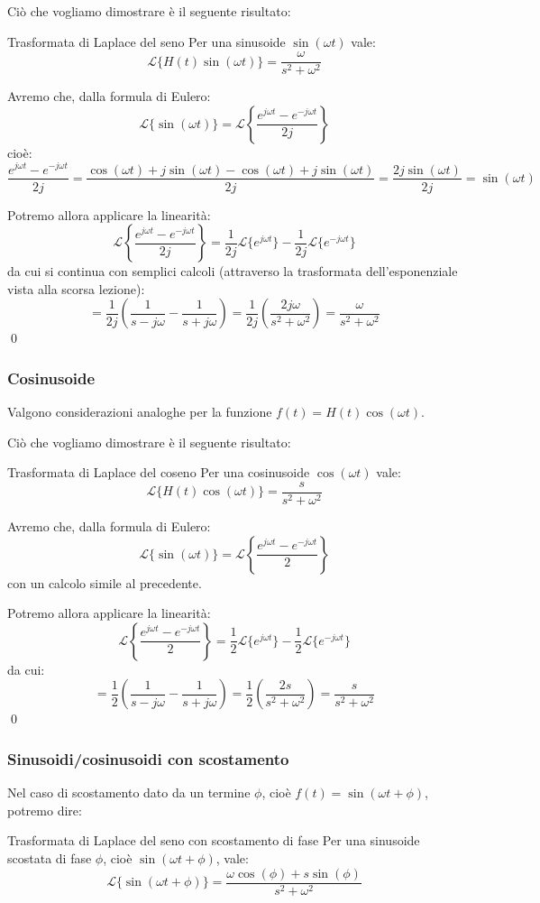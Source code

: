 \documentclass[a4paper,11pt]{article}
\begin{document}
Ciò che vogliamo dimostrare è il seguente risultato:
\begin{theorem}{Trasformata di Laplace del seno}
	Per una sinusoide $\sin(\omega t)$ vale:
	$$
		\mathcal{L}\{ H(t) \sin(\omega t) \} = \frac{\omega}{s^2 + \omega^2}
	$$
\end{theorem}

Avremo che, dalla formula di Eulero:
$$
\mathcal{L}\{\sin(\omega t)\} = \mathcal{L}\left\{ \frac{e^{j \omega t} - e^{- j \omega t}}{2j} \right\}
$$
cioè:
$$
\frac{e^{j \omega t} - e^{-j \omega t}}{2j} = \frac{ \cos(\omega t) + j \sin(\omega t) - \cos(\omega t) + j \sin(\omega t) }{2j} = \frac{2j \sin(\omega t)}{2j} = \sin(\omega t)
$$

Potremo allora applicare la linearità:
$$
\mathcal{L}\left\{ \frac{e^{j \omega t} - e^{- j \omega t}}{2j} \right\} = \frac{1}{2j} \mathcal{L}\{e^{j \omega t}\} - \frac{1}{2j} \mathcal{L}\{e^{-j \omega t}\}
$$
da cui si continua con semplici calcoli (attraverso la trasformata dell'esponenziale vista alla scorsa lezione):
$$
= \frac{1}{2j}\left( \frac{1}{s - j\omega} - \frac{1}{s + j \omega} \right) = \frac{1}{2j}\left( \frac{2j\omega}{s^2 + \omega^2} \right) = \frac{\omega}{s^2 + \omega^2}
$$ \qed

\subsubsection{Cosinusoide}
Valgono considerazioni analoghe per la funzione $f(t) = H(t) \cos(\omega t)$.

Ciò che vogliamo dimostrare è il seguente risultato:
\begin{theorem}{Trasformata di Laplace del coseno}
	Per una cosinusoide $\cos(\omega t)$ vale:
	$$
		\mathcal{L}\{ H(t) \cos(\omega t) \} = \frac{s}{s^2 + \omega^2}
	$$
\end{theorem}

Avremo che, dalla formula di Eulero:
$$
\mathcal{L}\{\sin(\omega t)\} = \mathcal{L}\left\{ \frac{e^{j \omega t} - e^{- j \omega t}}{2} \right\}
$$
con un calcolo simile al precedente.

Potremo allora applicare la linearità:
$$
\mathcal{L}\left\{ \frac{e^{j \omega t} - e^{- j \omega t}}{2} \right\} = \frac{1}{2} \mathcal{L}\{e^{j \omega t}\} - \frac{1}{2} \mathcal{L}\{e^{-j \omega t}\}
$$
da cui:
$$
= \frac{1}{2}\left( \frac{1}{s - j\omega} - \frac{1}{s + j \omega} \right) = \frac{1}{2}\left( \frac{2s}{s^2 + \omega^2} \right) = \frac{s}{s^2 + \omega^2}
$$ \qed

\subsubsection{Sinusoidi/cosinusoidi con scostamento}
Nel caso di scostamento dato da un termine $\phi$, cioè $f(t) = \sin(\omega t + \phi)$, potremo dire:
\begin{theorem}{Trasformata di Laplace del seno con scostamento di fase}
	Per una sinusoide scostata di fase $\phi$, cioè $\sin(\omega t + \phi)$, vale:
	$$
	\mathcal{L}\{ \sin(\omega t + \phi) \} = \frac{\omega \cos(\phi) + s \sin(\phi)}{s^2 + \omega^2}
	$$
\end{theorem}
\end{document}
